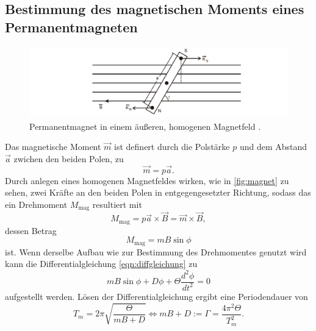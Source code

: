\subsection{Bestimmung des magnetischen Moments eines Permanentmagneten} 
    \begin{figure}
        \centering
        \includegraphics[width=\textwidth]{content/magnet.png}
        \caption{Permanentmagnet in einem äußeren, homogenen Magnetfeld \cite[103]{V102}.}
        \label{fig:magnet}
    \end{figure}
    Das magnetische Moment $\vec{m}$ ist definert durch die Polstärke $p$ und dem Abstand $\vec{a}$ zwichen den beiden Polen, zu
    \begin{equation}
    \label{eqn:magnetisch}
    \vec{m} = p \vec{a}.
    \end{equation}
    Durch anlegen eines homogenen Magnetfeldes wirken, wie in \autoref{fig:magnet} zu sehen, zwei Kräfte an den beiden Polen in 
    entgegengesetzter Richtung, sodass das ein Drehmoment $M_\text{mag}$ resultiert mit
    \begin{equation}
    \label{eqn:magdrehmoment}
    M_\text{mag} = p \vec{a} \times \vec{B} = \vec{m} \times \vec {B},
    \end{equation}
    dessen Betrag 
    \begin{equation}
    \label{eqn:betrag}
    M_\text{mag} = m B \sin \phi
    \end{equation}
    ist. Wenn derselbe Aufbau wie zur Bestimmung des Drehmomentes genutzt wird kann die Differentialgleichung \eqref{eqn:diffgleichung} zu
    \begin{equation}
    \label{eqn:magdiff}
    m B \sin \phi + D \phi + \Theta \frac{d^2\phi}{dt^2} = 0 
    \end{equation}
    aufgestellt werden.
    Lösen der Differentialgleichung ergibt eine Periodendauer von
    \begin{equation}
    \label{eqn:Periodendauermagnet}
    T_m = 2 \pi \sqrt{\frac{\Theta}{m B + D}} \iff m B + D := \Gamma = \frac {4 \pi^2 \Theta} {T_m^{2}}.
    \end{equation}

